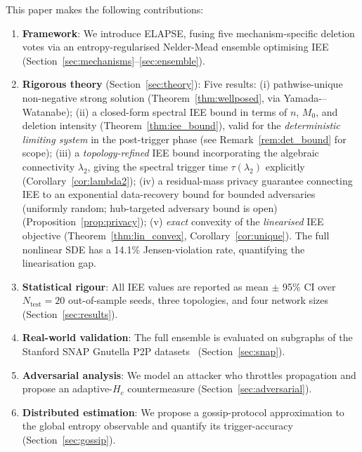 \documentclass[review,12pt]{elsarticle}
\newcommand{\Hc}{H_c}
\begin{document}
This paper makes the following contributions:
\begin{enumerate}
  \item \textbf{Framework}: We introduce ELAPSE, fusing five mechanism-specific
        deletion votes via an entropy-regularised Nelder-Mead ensemble optimising
        IEE (Section~\ref{sec:mechanisms}--\ref{sec:ensemble}).
  \item \textbf{Rigorous theory} (Section~\ref{sec:theory}):
        Five results: (i) pathwise-unique non-negative strong solution
        (Theorem~\ref{thm:wellposed}, via Yamada-–Watanabe);
        (ii) a closed-form spectral IEE bound in terms of $n$, $M_0$,
        and deletion intensity (Theorem~\ref{thm:iee_bound}), valid for the \emph{deterministic limiting system} in the post-trigger phase (see Remark~\ref{rem:det_bound} for scope);
        (iii) a \emph{topology-refined} IEE bound incorporating the
        algebraic connectivity $\lambda_2$, giving the spectral trigger
        time $\tau(\lambda_2)$ explicitly (Corollary~\ref{cor:lambda2});
        (iv) a residual-mass privacy guarantee connecting IEE to an
        exponential data-recovery bound for bounded adversaries
        (uniformly random; hub-targeted adversary bound is open)
        (Proposition~\ref{prop:privacy});
        (v) \emph{exact} convexity of the \emph{linearised} IEE objective
        (Theorem~\ref{thm:lin_convex}, Corollary~\ref{cor:unique}).
        The full nonlinear SDE has a 14.1\% Jensen-violation rate,
        quantifying the linearisation gap.
  \item \textbf{Statistical rigour}: All IEE values are reported as
        mean $\pm$ 95\% CI over $N_{\mathrm{test}} = 20$ out-of-sample seeds,
        three topologies, and four network sizes (Section~\ref{sec:results}).
  \item \textbf{Real-world validation}: The full ensemble is evaluated on
        subgraphs of the Stanford SNAP Gnutella P2P
        datasets~\cite{snapnets} (Section~\ref{sec:snap}).
  \item \textbf{Adversarial analysis}: We model an attacker who throttles
        propagation and propose an adaptive-$\Hc$ countermeasure
        (Section~\ref{sec:adversarial}).
  \item \textbf{Distributed estimation}: We propose a gossip-protocol
        approximation to the global entropy observable and quantify its
        trigger-accuracy (Section~\ref{sec:gossip}).
\end{enumerate}
\end{document}
